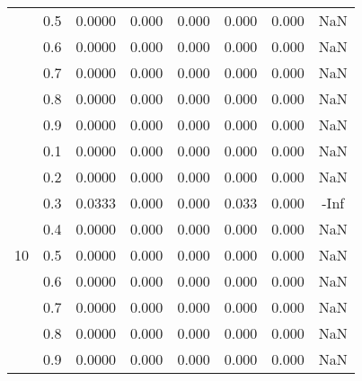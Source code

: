 \documentclass[11pt,a4paper]{report}
\begin{document}
\begin{longtable}{ | c | c || c | c | c | c | c | c | }
 & 0.5 & 0.0000 & 0.000 & 0.000 & 0.000 & 0.000 & NaN \\
 & 0.6 & 0.0000 & 0.000 & 0.000 & 0.000 & 0.000 & NaN \\
 & 0.7 & 0.0000 & 0.000 & 0.000 & 0.000 & 0.000 & NaN \\
 & 0.8 & 0.0000 & 0.000 & 0.000 & 0.000 & 0.000 & NaN \\
 & 0.9 & 0.0000 & 0.000 & 0.000 & 0.000 & 0.000 & NaN \\
 \hline
\multirow{9}{*}{10} & 0.1 & 0.0000 & 0.000 & 0.000 & 0.000 & 0.000 & NaN \\
 & 0.2 & 0.0000 & 0.000 & 0.000 & 0.000 & 0.000 & NaN \\
 & 0.3 & 0.0333 & 0.000 & 0.000 & 0.033 & 0.000 & -Inf \\
 & 0.4 & 0.0000 & 0.000 & 0.000 & 0.000 & 0.000 & NaN \\
 & 0.5 & 0.0000 & 0.000 & 0.000 & 0.000 & 0.000 & NaN \\
 & 0.6 & 0.0000 & 0.000 & 0.000 & 0.000 & 0.000 & NaN \\
 & 0.7 & 0.0000 & 0.000 & 0.000 & 0.000 & 0.000 & NaN \\
 & 0.8 & 0.0000 & 0.000 & 0.000 & 0.000 & 0.000 & NaN \\
 & 0.9 & 0.0000 & 0.000 & 0.000 & 0.000 & 0.000 & NaN \\
 \hline
\hline
\end{longtable}
\end{document}
